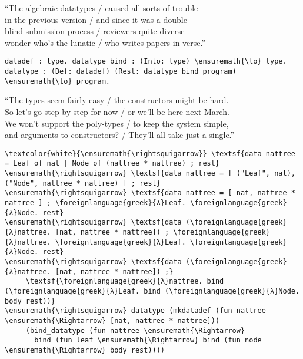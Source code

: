 \importantCodeblockEnd{}

\begin{versy}
``The algebraic datatypes / caused all sorts of trouble \\
in the previous version / and since it was a double- \\
blind submission process / reviewers quite diverse \\
wonder who's the lunatic / who writes papers in verse.''
\end{versy}

\begin{verbatim}
datadef : type. datatype_bind : (Into: type) \ensuremath{\to} type.
datatype : (Def: datadef) (Rest: datatype_bind program) \ensuremath{\to} program.
\end{verbatim}

\begin{versy}
``The types seem fairly easy / the constructors might be hard. \\
So let's go step-by-step for now / or we'll be here next March. \\
We won't support the poly-types / to keep the system simple, \\
and arguments to constructors? / They'll all take just a single.''
\end{versy}

\begin{verbatim}
\textcolor{white}{\ensuremath{\rightsquigarrow}} \textsf{data nattree = Leaf of nat | Node of (nattree * nattree) ; rest}
\ensuremath{\rightsquigarrow} \textsf{data nattree = [ ("Leaf", nat), ("Node", nattree * nattree) ] ; rest}
\ensuremath{\rightsquigarrow} \textsf{data nattree = [ nat, nattree * nattree ] ; \foreignlanguage{greek}{λ}Leaf. \foreignlanguage{greek}{λ}Node. rest}
\ensuremath{\rightsquigarrow} \textsf{data (\foreignlanguage{greek}{λ}nattree. [nat, nattree * nattree]) ; \foreignlanguage{greek}{λ}nattree. \foreignlanguage{greek}{λ}Leaf. \foreignlanguage{greek}{λ}Node. rest}
\ensuremath{\rightsquigarrow} \textsf{data (\foreignlanguage{greek}{λ}nattree. [nat, nattree * nattree]) ;}
     \textsf{\foreignlanguage{greek}{λ}nattree. bind (\foreignlanguage{greek}{λ}Leaf. bind (\foreignlanguage{greek}{λ}Node. body rest))}
\ensuremath{\rightsquigarrow} datatype (mkdatadef (fun nattree \ensuremath{\Rightarrow} [nat, nattree * nattree]))
     (bind_datatype (fun nattree \ensuremath{\Rightarrow}
       bind (fun leaf \ensuremath{\Rightarrow} bind (fun node \ensuremath{\Rightarrow} body rest))))
\end{verbatim}

